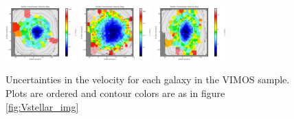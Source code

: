 \begin{figure}
      \includegraphics[width=0.245\textwidth]{Vmaps/ic1531_stellar_vel_uncert.png}
      \includegraphics[width=0.245\textwidth]{Vmaps/ngc1399_stellar_vel_uncert.png}
      \includegraphics[width=0.245\textwidth]{Vmaps/eso443-g024_stellar_vel_uncert.png}
      \caption[VIMOS velocity uncertocity maps]{Uncertainties in the velocity for each galaxy in the VIMOS sample. Plots are ordered and contour colors are as in figure \ref{fig:Vstellar_img}}
      \label{fig:Vstellar_vel_uncert}
\end{figure}

